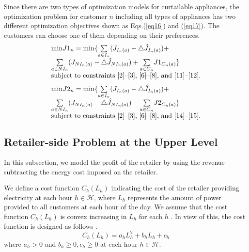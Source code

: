 \documentclass[10pt,journal]{IEEEtran}
\theoremstyle{definition}
\theoremstyle{plain} \newtheorem{theo}{Theorem} \newtheorem{prop}{Proposition}  \newtheorem{lemm}{Lemma}
\begin{document}
Since there are two types of optimization models for curtailable appliances, the optimization problem for customer $n$ including all types of appliances has two different optimization objectives shown as Eqs.(\ref{eq16}) and (\ref{eq17}). The customers can choose one of them depending on their preferences. 
\begin{equation} \label{eq16}
\begin{array}{l} 
{\operatorname{\min}} J1_n = {\operatorname{\min  }} \{ \underset{a \in I_n} \sum  (J_{I_n(a)} - \triangle \hat{J}_{I_n(a)}) + \\
\underset{a \in NI_n} \sum (J_{NI_n(a)} -  \triangle \hat{J}_{NI_n(a)}) + \underset{{a \in C_n}} \sum J1_{C_n(a)}\}\\

\text{subject to constraints \eqref{2}--\eqref{3}, \eqref{6}--\eqref{8}, and \eqref{11}--\eqref{12}}.
 \end{array}
\end{equation}
\begin{equation} \label{eq17}
\begin{array}{l} 
{\operatorname{\min}} J2_n = {\operatorname{\min  }} \{\underset{a \in I_n} \sum  (J_{I_n(a)} - \triangle \hat{J}_{I_n(a)} ) + \\
\underset{a \in NI_n} \sum (J_{NI_n(a)} -  \triangle \hat{J}_{NI_n(a)}) - \underset{{a \in C_n}} \sum J2_{C_n(a)}\}\\
 \text{subject to constraints \eqref{2}--\eqref{3}, \eqref{6}--\eqref{8}, and \eqref{14}--\eqref{15}}.
 \end{array}
\end{equation}






\subsection{Retailer-side Problem at the Upper Level}

In this subsection, we model the profit of the retailer by using the revenue subtracting the energy cost imposed on the retailer.

We define a cost function $ C_h(L_h)$ indicating the cost of the retailer providing electricity at each hour $h \in \mathcal{H} $, where $ L_h $  represents the amount of power provided to all customers at each hour of the day. We assume that the cost function $ C_h(L_h)$ is convex increasing in $ L_h $ for each $h$ \cite{Mohsenian-Rad2010} \cite{Li2011}. In view of this, the cost function is designed as follows \cite{Mohsenian-Rad2010}.
\begin{equation} \label{costfunction}
C_h(L_h) = a_h L_h^2 + b_h L_h + c_h 
\end{equation}
where $a_h > 0$ and $b_h \geq 0, c_h \geq 0$ at each hour $h \in \mathcal{H}$.
\end{document}
